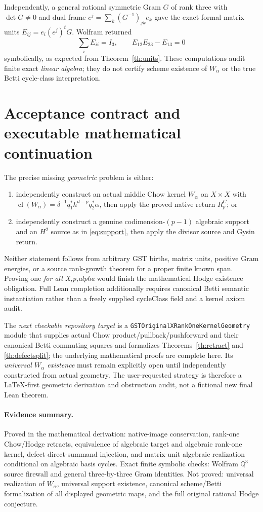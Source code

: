 \documentclass[11pt,a4paper]{article}
\newcommand{\Q}{\mathbb Q}
\newcommand{\cl}{\operatorname{cl}}
\begin{document}
Independently, a general rational symmetric Gram \(G\) of rank
three with \(\det G\ne0\) and dual frame
\(e^j=\sum_k(G^{-1})_{jk}e_k\) gave the exact
formal matrix units \(E_{ij}=e_i(e^j)^t G\).
Wolfram returned
\[
       \sum_i E_{ii}=I_3,\qquad
       E_{12}E_{23}-E_{13}=0
\]
symbolically, as expected from Theorem~\ref{th:units}.
These computations audit finite exact \emph{linear algebra};
they do not certify scheme existence of \(W_\alpha\)
or the true Betti cycle-class interpretation.

\section{Acceptance contract and executable mathematical continuation}
The precise missing \emph{geometric} problem is either:
\begin{enumerate}
\item independently construct an actual middle Chow kernel
\(W_\alpha\) on \(X\times X\) with
\(\cl(W_\alpha)=\delta^{-1}q_1^*h^{d-p}q_2^*\alpha\),
then apply the proved native return \(R^C_p\); or
\item independently construct a genuine codimension-\((p-1)\)
algebraic support and an \(H^2\) source as in
\eqref{eq:support}, then apply the divisor source and Gysin return.
\end{enumerate}
Neither statement follows from arbitrary GST births,
matrix units, positive Gram energies, or a source
rank-growth theorem for a proper finite known span.
Proving one \emph{for all X,p,alpha} would finish the
mathematical Hodge existence obligation.  Full Lean
completion additionally requires canonical Betti
semantic instantiation rather than a freely supplied
cycleClass field and a kernel axiom audit.

The \emph{next checkable repository target} is a
\texttt{GSTOriginalXRankOneKernelGeometry} module
that supplies actual Chow product/pullback/pushforward
and their canonical Betti commuting squares and
formalizes Theorems~\ref{th:retract} and
\ref{th:defectsplit}; the underlying mathematical
proofs are complete here.  Its \emph{universal
\(W_\alpha\) existence} must remain explicitly open
until independently constructed from actual geometry.
The user-requested strategy is therefore a
LaTeX-first geometric derivation and obstruction
audit, not a fictional new final Lean theorem.

\paragraph{Evidence summary.}
Proved in the mathematical derivation:
native-image conservation, rank-one Chow/Hodge
retracts, equivalence of algebraic target and
algebraic rank-one kernel, defect direct-summand
injection, and matrix-unit algebraic realization
conditional on algebraic basis cycles.
Exact finite symbolic checks: Wolfram \(\Q^3\) source
firewall and general three-by-three Gram identities.
Not proved: universal realization of \(W_\alpha\),
universal support existence, canonical scheme/Betti
formalization of all displayed geometric maps,
and the full original rational Hodge conjecture.
\end{document}

